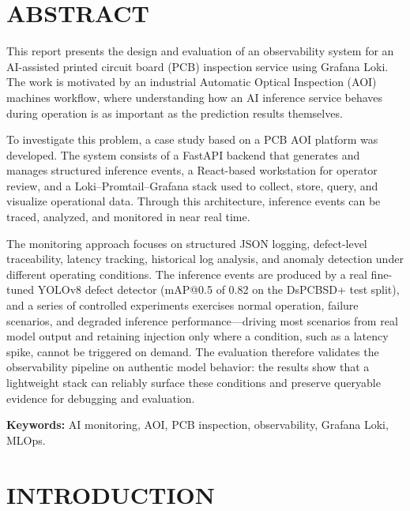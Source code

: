 \documentclass[12pt,a4paper]{article}
\begin{document}
\listoftables
\clearpage
{}
\listoffigures
\clearpage

\section*{ABSTRACT}
This report presents the design and evaluation of an observability system for an
AI-assisted printed circuit board (PCB) inspection service using Grafana Loki. The
work is motivated by an industrial Automatic Optical Inspection (AOI) machines workflow,
where understanding how an AI inference service behaves during operation is as
important as the prediction results themselves.

To investigate this problem, a case study based on a PCB AOI platform was
developed. The system consists of a FastAPI backend that generates and manages
structured inference events, a React-based workstation for operator review, and a
Loki--Promtail--Grafana stack used to collect, store, query, and visualize
operational data. Through this architecture, inference events can be traced,
analyzed, and monitored in near real time.

The monitoring approach focuses on structured JSON logging, defect-level
traceability, latency tracking, historical log analysis, and anomaly detection
under different operating conditions. The inference events are produced by a real
fine-tuned YOLOv8 defect detector (mAP@0.5 of 0.82 on the DsPCBSD+ test split),
and a series of controlled experiments exercises normal operation, failure
scenarios, and degraded inference performance---driving most scenarios from real
model output and retaining injection only where a condition, such as a latency
spike, cannot be triggered on demand. The evaluation therefore validates the
observability pipeline on authentic model behavior: the results show that a
lightweight stack can reliably surface these conditions and preserve queryable
evidence for debugging and evaluation.

\vspace{1em}
\noindent\textbf{Keywords:} AI monitoring, AOI, PCB inspection, observability,
Grafana Loki, MLOps.
\clearpage

\section{INTRODUCTION}
\end{document}
